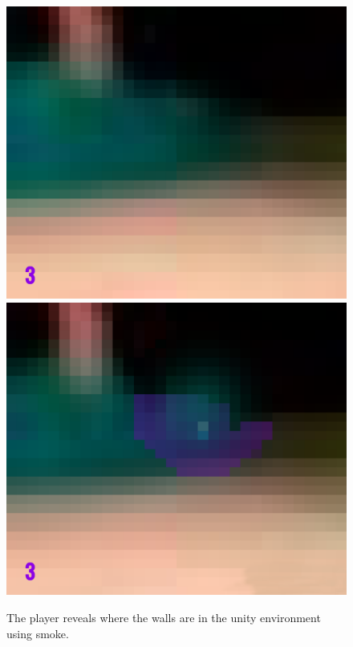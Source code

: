 \begin{figure}[p]
  \centering
  \includegraphics[width=\imgWidth]{images/game_systems/NoSmoke.png} \\[\picVdist]
  \includegraphics[width=\imgWidth]{images/game_systems/ThrowSmoke.png}
  \caption{The player reveals where the walls are in the unity environment using smoke.}
  \label{SmokeInEnvironment}
\end{figure}


